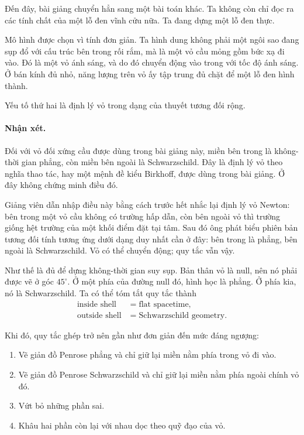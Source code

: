 Đến đây, bài giảng chuyển hẳn sang một bài toán khác. Ta không còn chỉ đọc ra các tính chất của một lỗ đen vĩnh cửu nữa. Ta đang dựng một lỗ đen thực.

Mô hình được chọn vì tính đơn giản. Ta hình dung không phải một ngôi sao đang sụp đổ với cấu trúc bên trong rối rắm, mà là một vỏ cầu mỏng gồm bức xạ đi vào. Đó là một vỏ ánh sáng, và do đó chuyển động vào trong với tốc độ ánh sáng. Ở bán kính đủ nhỏ, năng lượng trên vỏ ấy tập trung đủ chặt để một lỗ đen hình thành.

Yếu tố thứ hai là định lý vỏ trong dạng của thuyết tương đối rộng.

\paragraph{Nhận xét.} Đối với vỏ đối xứng cầu được dùng trong bài giảng này, miền bên trong là không-thời gian phẳng, còn miền bên ngoài là Schwarzschild. Đây là định lý vỏ theo nghĩa thao tác, hay một mệnh đề kiểu Birkhoff, được dùng trong bài giảng. Ở đây không chứng minh điều đó.

Giảng viên dẫn nhập điều này bằng cách trước hết nhắc lại định lý vỏ Newton: bên trong một vỏ cầu không có trường hấp dẫn, còn bên ngoài vỏ thì trường giống hệt trường của một khối điểm đặt tại tâm. Sau đó ông phát biểu phiên bản tương đối tính tương ứng dưới dạng duy nhất cần ở đây: bên trong là phẳng, bên ngoài là Schwarzschild. Vỏ có thể chuyển động; quy tắc vẫn vậy.

Như thế là đủ để dựng không-thời gian suy sụp. Bản thân vỏ là null, nên nó phải được vẽ ở góc \(45^\circ\). Ở một phía của đường null đó, hình học là phẳng. Ở phía kia, nó là Schwarzschild. Ta có thể tóm tắt quy tắc thành
\begin{equation}
\begin{aligned}
\text{inside shell} &= \text{flat spacetime},\\
\text{outside shell} &= \text{Schwarzschild geometry}.
\end{aligned}
\end{equation}

Khi đó, quy tắc ghép trở nên gần như đơn giản đến mức đáng ngượng:

\begin{enumerate}
\item Vẽ giản đồ Penrose phẳng và chỉ giữ lại miền nằm phía trong vỏ đi vào.
\item Vẽ giản đồ Penrose Schwarzschild và chỉ giữ lại miền nằm phía ngoài chính vỏ đó.
\item Vứt bỏ những phần sai.
\item Khâu hai phần còn lại với nhau dọc theo quỹ đạo của vỏ.
\end{enumerate}

